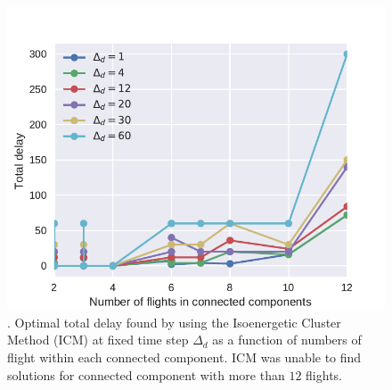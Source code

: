 \begin{figure}[h]
  \includegraphics[width=\columnwidth]{pics/qubo_icm/qubo_icm_2.pdf}
  \caption{\label{fig:icm2}. Optimal total delay found by using the Isoenergetic
  Cluster Method (ICM) at fixed time step $\Delta_d$ as a function of numbers of
  flight within each connected component. ICM was unable to find solutions for connected
  component with more than $12$ flights.}
\end{figure}

